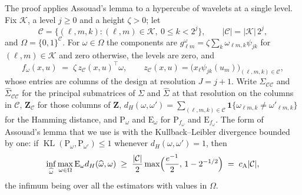 \documentclass[10pt]{book}
\theoremstyle{definition}
\newcommand{\E}{\mathrm{E}}
\newcommand{\Prob}{\mathrm{P}}
\newcommand{\T}{^{\top}}
\newcommand{\cv}{\ell}
\newcommand{\md}{m}
\newcommand{\lev}{j}
\newcommand{\tsl}{k}
\newcommand{\bZ}{\mathbf{Z}}
\newcommand{\gcomp}[2]{g_{#1#2}}
\newcommand{\wav}[2]{\psi_{#1#2}}
\newcommand{\Gram}{\Sigma}
\newcommand{\Gramhat}{\widehat{\Sigma}}
\newcommand{\Kcal}{\mathcal{K}}
\newcommand{\cA}{c_{\mathrm{A}}}
\begin{document}
{The proof applies Assouad's lemma to a hypercube of wavelets at a single
level. Fix $\Kcal$, a level $\lev \ge 0$ and a height $\zeta > 0$; let
\[
  \mathcal{C} = \bigl\{(\cv,\md,\tsl) : (\cv,\md)\in\Kcal,\ 0 \le \tsl < 2^{\lev}\bigr\},
  \qquad |\mathcal{C}| = |\Kcal|\,2^{\lev},
\]
and $\Omega = \{0,1\}^{\mathcal{C}}$. For $\omega \in \Omega$ the components
are $\gcomp{\cv}{\md}^{\omega} =
\zeta\sum_{\tsl}\omega_{\cv\md,\tsl}\wav{\lev}{\tsl}$ for
$(\cv,\md) \in \Kcal$ and zero otherwise, the levels are zero, and
\[
  f_{\omega}(x,u) \;=\; \zeta\,z_{\mathcal{C}}(x,u)\T\omega,
  \qquad
  z_{\mathcal{C}}(x,u) = \bigl(x_{\cv}\wav{\lev}{\tsl}(u_{\md})\bigr)_{(\cv,\md,\tsl)\in\mathcal{C}} ,
\]
whose entries are columns of the design at resolution $J = \lev + 1$. Write
$\Gram_{\mathcal{C}\mathcal{C}}$ and $\Gramhat_{\mathcal{C}\mathcal{C}}$ for
the principal submatrices of $\Gram$ and $\Gramhat$ at that resolution on the
columns in $\mathcal{C}$, $\bZ_{\mathcal{C}}$ for those columns of $\bZ$,
$d_{H}(\omega,\omega') = \sum_{(\cv,\md,\tsl)\in\mathcal{C}}
\mathbf{1}\{\omega_{\cv\md,\tsl} \ne \omega'_{\cv\md,\tsl}\}$ for the Hamming
distance, and $\Prob_{\omega}$ and $\E_{\omega}$ for $\Prob_{f_{\omega}}$ and
$\E_{f_{\omega}}$. The form of Assouad's lemma that we use is
\citet[Theorem~2.12(iv)]{Tsybakov-2009} with the Kullback--Leibler divergence
bounded by one: if $\operatorname{KL}(\Prob_{\omega},\Prob_{\omega'}) \le 1$
whenever $d_{H}(\omega,\omega') = 1$, then
\begin{equation}
  \label{eq:assouad}
  \inf_{\widehat\omega}\max_{\omega\in\Omega}\E_{\omega}d_{H}(\widehat\omega,\omega)
  \;\ge\; \frac{|\mathcal{C}|}{2}\max\Bigl(\frac{e^{-1}}{2},\,1-2^{-1/2}\Bigr)
  \;=\; \cA|\mathcal{C}| ,
\end{equation}
the infimum being over all the estimators with values in $\Omega$.

}
\end{document}
